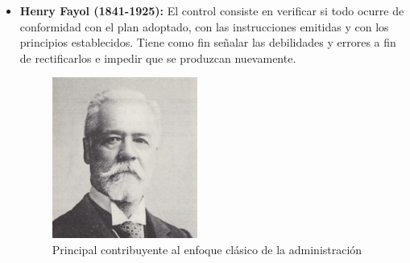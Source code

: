 \documentclass[12pt,letterpaper]{article}
\begin{document}
\begin{itemize}
\item \textbf{Henry Fayol (1841-1925):} El control consiste en verificar si todo ocurre de conformidad con el plan adoptado, con las instrucciones emitidas y con los principios establecidos. Tiene como fin señalar las debilidades y errores a fin de rectificarlos e impedir que se produzcan nuevamente.
\begin{figure}[h]
\centering
\includegraphics[scale=0.5]{Fayol}
\caption{Principal contribuyente al enfoque clásico de la administración}
\end{figure}


\end{itemize}
\end{document}
